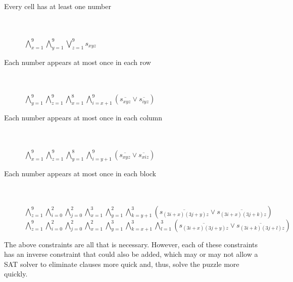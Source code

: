 \documentclass[12pt]{article}
\newcounter{row}
\newcounter{col}
\begin{document}
\begin{description}
\item[Every cell has at least one number] \hfill \\ \\
$\bigwedge\limits_{x=1}^{9} \bigwedge\limits_{y=1}^{9} \bigvee\limits_{z=1}^{9} s_{xyz}$
\item[Each number appears at most once in each row] \hfill \\ \\
$\bigwedge\limits_{y=1}^{9} \bigwedge\limits_{z=1}^{9} \bigwedge\limits_{x=1}^{8} \bigwedge\limits_{i=x+1}^{9}  (\overline{s_{xyz}} \vee \overline{s_{iyz}})$
\item[Each number appears at most once in each column] \hfill \\ \\
$\bigwedge\limits_{x=1}^{9} \bigwedge\limits_{z=1}^{9} \bigwedge\limits_{y=1}^{8} \bigwedge\limits_{i=y+1}^{9}  (\overline{s_{xyz}} \vee \overline{s_{xiz}})$
\item[Each number appears at most once in each block] \hfill \\ \\
$\bigwedge\limits_{z=1}^{9} \bigwedge\limits_{i=0}^{2} \bigwedge\limits_{j=0}^{2} \bigwedge\limits_{x=1}^{3} \bigwedge\limits_{y=1}^{2} \bigwedge\limits_{k=y+1}^{3} (\overline{s_{(3i+x)(3j+y)z}} \vee \overline{s_{(3i+x)(3j+k)z}})$ \\

$\bigwedge\limits_{z=1}^{9} \bigwedge\limits_{i=0}^{2} \bigwedge\limits_{j=0}^{2} \bigwedge\limits_{x=1}^{2} \bigwedge\limits_{y=1}^{3} \bigwedge\limits_{k=x+1}^{3} \bigwedge\limits_{l=1}^{3} (\overline{s_{(3i+x)(3j+y)z}} \vee \overline{s_{(3i+k)(3j+l)z}})$
\end{description}

The above constraints are all that is necessary. However, each of these constraints has an inverse constraint that could also be added, which may or may not allow a SAT solver to eliminate clauses more quick and, thus, solve the puzzle more quickly.
\end{document}
